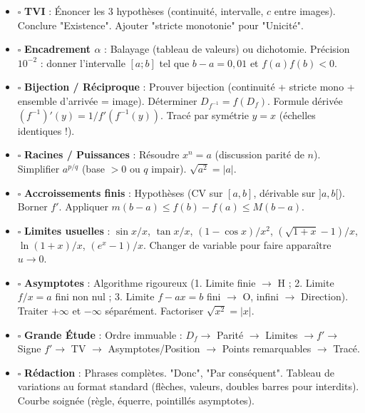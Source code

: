 \documentclass[11pt]{article}
\begin{document}
\begin{aretenir}
\begin{itemize}
  \item $\square$ \textbf{TVI} : Énoncer les 3 hypothèses (continuité, intervalle, $c$ entre images). Conclure "Existence". Ajouter "stricte monotonie" pour "Unicité".
  \item $\square$ \textbf{Encadrement $\alpha$} : Balayage (tableau de valeurs) ou dichotomie. Précision $10^{-2}$ : donner l'intervalle $[a;b]$ tel que $b-a=0,01$ et $f(a)f(b)<0$.
  \item $\square$ \textbf{Bijection / Réciproque} : Prouver bijection (continuité + stricte mono + ensemble d'arrivée = image). Déterminer $D_{f^{-1}} = f(D_f)$. Formule dérivée $(f^{-1})'(y) = 1/f'(f^{-1}(y))$. Tracé par symétrie $y=x$ (échelles identiques !).
  \item $\square$ \textbf{Racines / Puissances} : Résoudre $x^n=a$ (discussion parité de $n$). Simplifier $a^{p/q}$ (base $>0$ ou $q$ impair). $\sqrt{a^2}=|a|$.
  \item $\square$ \textbf{Accroissements finis} : Hypothèses (CV sur $[a,b]$, dérivable sur $]a,b[$). Borner $f'$. Appliquer $m(b-a) \le f(b)-f(a) \le M(b-a)$.
  \item $\square$ \textbf{Limites usuelles} : $\sin x/x$, $\tan x/x$, $(1-\cos x)/x^2$, $(\sqrt{1+x}-1)/x$, $\ln(1+x)/x$, $(e^x-1)/x$. Changer de variable pour faire apparaître $u\to 0$.
  \item $\square$ \textbf{Asymptotes} : Algorithme rigoureux (1. Limite finie $\to$ H ; 2. Limite $f/x = a$ fini non nul ; 3. Limite $f-ax = b$ fini $\to$ O, infini $\to$ Direction). Traiter $+\infty$ et $-\infty$ séparément. Factoriser $\sqrt{x^2}=|x|$.
  \item $\square$ \textbf{Grande Étude} : Ordre immuable : $D_f \to$ Parité $\to$ Limites $\to f' \to$ Signe $f' \to$ TV $\to$ Asymptotes/Position $\to$ Points remarquables $\to$ Tracé.
  \item $\square$ \textbf{Rédaction} : Phrases complètes. "Donc", "Par conséquent". Tableau de variations au format standard (flèches, valeurs, doubles barres pour interdits). Courbe soignée (règle, équerre, pointillés asymptotes).
\end{itemize}
\end{aretenir}
\end{document}
